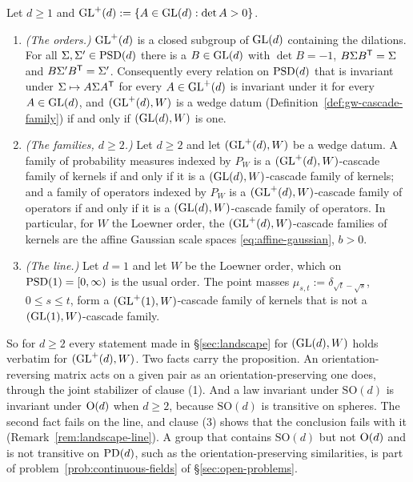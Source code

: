 \begin{proposition}\label{prop:glplus-families}
Let $d \ge 1$ and $\mathrm{GL}^+(d) := \{A \in \mathrm{GL}(d) : \det A > 0\}$.
\begin{enumerate}
\item \emph{(The orders.)} $\mathrm{GL}^+(d)$ is a closed subgroup of $\mathrm{GL}(d)$ containing the dilations. For
all $\Sigma, \Sigma' \in \mathrm{PSD}(d)$ there is a $B \in \mathrm{GL}(d)$ with $\det B = -1$, $B\Sigma B^{\mathsf{T}} = \Sigma$
and $B\Sigma'B^{\mathsf{T}} = \Sigma'$. Consequently every relation on $\mathrm{PSD}(d)$ that is invariant under
$\Sigma \mapsto A\Sigma A^{\mathsf{T}}$ for every $A \in \mathrm{GL}^+(d)$ is invariant under it for every
$A \in \mathrm{GL}(d)$, and $(\mathrm{GL}^+(d), W)$ is a wedge datum (Definition~\ref{def:gw-cascade-family}) if and only if
$(\mathrm{GL}(d), W)$ is one.
\item \emph{(The families, $d \ge 2$.)} Let $d \ge 2$ and let $(\mathrm{GL}^+(d), W)$ be a wedge datum. A
family of probability measures indexed by $P_W$ is a $(\mathrm{GL}^+(d), W)$-cascade family of kernels if and
only if it is a $(\mathrm{GL}(d), W)$-cascade family of kernels; and a family of operators indexed by $P_W$ is
a $(\mathrm{GL}^+(d), W)$-cascade family of operators if and only if it is a $(\mathrm{GL}(d), W)$-cascade family of
operators. In particular, for $W$ the Loewner order, the $(\mathrm{GL}^+(d), W)$-cascade families of kernels
are the affine Gaussian scale spaces \ref{eq:affine-gaussian}, $b > 0$.
\item \emph{(The line.)} Let $d = 1$ and let $W$ be the Loewner order, which on $\mathrm{PSD}(1) = [0,\infty)$
is the usual order. The point masses $\mu_{s,t} := \delta_{\sqrt t - \sqrt s}$, $0 \le s \le t$, form a
$(\mathrm{GL}^+(1), W)$-cascade family of kernels that is not a $(\mathrm{GL}(1), W)$-cascade family.
\end{enumerate}
\end{proposition}

So for $d \ge 2$ every statement made in \S\ref{sec:landscape} for $(\mathrm{GL}(d), W)$ holds verbatim for
$(\mathrm{GL}^+(d), W)$. Two facts carry the proposition. An orientation-reversing matrix acts on a given pair
as an orientation-preserving one does, through the joint stabilizer of clause (1). And a law
invariant under $\mathrm{SO}(d)$ is invariant under $\mathrm{O}(d)$ when $d \ge 2$, because $\mathrm{SO}(d)$
is transitive on spheres. The second fact fails on the line, and clause (3) shows that the conclusion
fails with it (Remark~\ref{rem:landscape-line}). A group that
contains $\mathrm{SO}(d)$ but not $\mathrm{O}(d)$ and is not transitive on $\mathrm{PD}(d)$, such as the
orientation-preserving similarities, is part of problem~\ref{prob:continuous-fields} of
\S\ref{sec:open-problems}.

